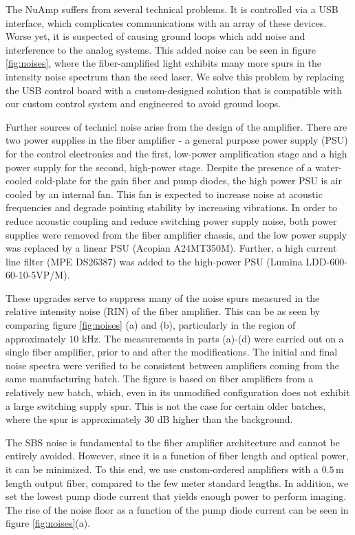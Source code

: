 \documentclass[twocolumn,aps,pra,showpacs,preprintnumbers,bibnotes]{revtex4-1}
\begin{document}
The NuAmp suffers from several technical problems. 
It is controlled via a USB interface, which complicates communications with an array of these devices.  
Worse yet, it is suspected of causing ground loops which add noise and interference to the analog systems. 
This added noise can be seen in figure \ref{fig:noises}, where the fiber-amplified light exhibits many more spurs in the intensity noise spectrum than the seed laser.
We solve this problem by replacing the USB control board with a custom-designed solution  that is compatible with our custom control system and engineered to avoid ground loops.


Further sources of technicl noise arise from the design of the amplifier. There are two power supplies in the fiber amplifier - a general purpose power supply (PSU) for the control electronics and the first, low-power amplification stage and a high power supply for the second, high-power stage. 
Despite the presence of a water-cooled cold-plate for the gain fiber and pump diodes, the high power PSU is air cooled by an internal fan.
This fan is expected to increase noise at acoustic frequencies and degrade pointing stability by increasing vibrations.
In order to reduce acoustic coupling and reduce switching power supply noise, both power supplies were removed from the fiber amplifier chassis, and the low power supply was replaced by a linear PSU (Acopian A24MT350M). 
Further, a high current line filter (MPE DS26387) was added to the high-power PSU (Lumina LDD-600-60-10-5VP/M).



These upgrades serve to suppress many of the noise spurs measured in the relative intensity noise (RIN) of the fiber amplifier. 
This can be as seen by comparing figure \ref{fig:noises} (a) and (b), particularly in the region of approximately $10$ kHz. 
The measurements in parts (a)-(d) were carried out on a single fiber amplifier, prior to and after the modifications. The initial and final noise spectra were verified to be consistent between amplifiers coming from the same manufacturing batch.
The figure is based on fiber amplifiers from a relatively new batch, which, even in its unmodified configuration does not exhibit a large switching supply spur. 
This is not the case for certain older batches, where the spur is approximately 30 dB higher than the background.

The SBS noise is fundamental to the fiber amplifier architecture and cannot be entirely avoided. However, since it is a function of fiber length and optical power, it can be minimized. To this end, we use custom-ordered amplifiers with a $0.5\,$m length output fiber, compared to the few meter standard lengths.
In addition, we set the lowest pump diode current that yields enough power to perform imaging. 
The rise of the noise floor as a function of the pump diode current can be seen in figure \ref{fig:noises}(a).
\end{document}
